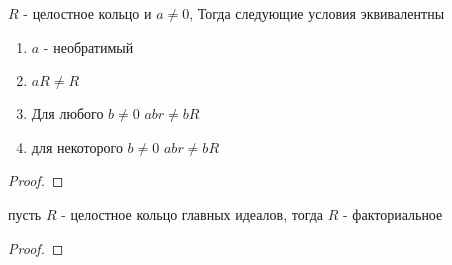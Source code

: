 \documentclass[../main/document.tex]{subfiles}
\begin{document}
\begin{thm}
$R$ - целостное кольцо и $a\neq 0$, Тогда следующие условия эквивалентны
\begin{enumerate}
\item $a$ - необратимый
\item $aR\neq R$
\item Для любого $b\neq 0$ $abr\neq bR$
\item для некоторого $b\neq 0$ $abr\neq bR$
\end{enumerate}
\begin{proof}

\end{proof}
\end{thm}
\begin{thm}
пусть $R$ - целостное кольцо главных идеалов, тогда $R$ - факториальное
\begin{proof}

\end{proof}
\end{thm}
\end{document}
